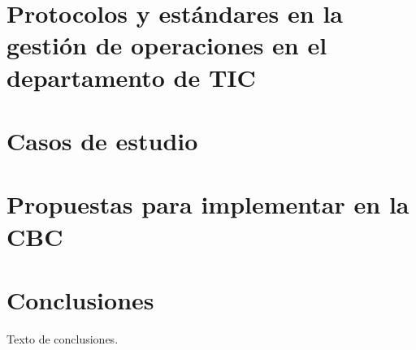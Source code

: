 \documentclass{article}
\begin{document}
\section{Protocolos y estándares en la gestión de operaciones en el departamento de TIC}

\section{Casos de estudio}

\section{Propuestas para implementar en la CBC}

\section{Conclusiones}
Texto de conclusiones.

\printindex
\end{document}
